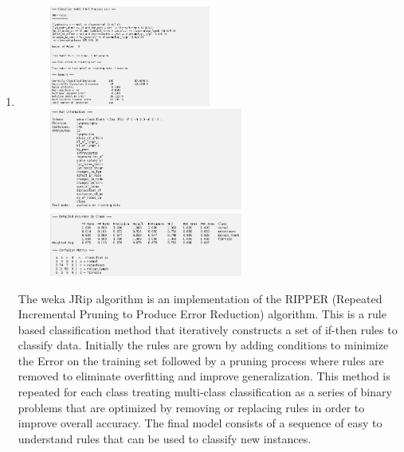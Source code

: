 \documentclass{article}
\begin{document}
\begin{enumerate}[label = (\alph*), left=10pt, itemsep=10pt]
        \item \begin{minipage}[t]{0.9\textwidth}
            \begin{figure}[H]
                \includegraphics[width=0.5\textwidth, height=0.2\textheight]{./6bi1.png}\\
                \includegraphics[width=0.6\textwidth, height=0.3\textheight]{./6bii1.png}\\
                \includegraphics[width=0.6\textwidth, height=0.15\textheight]{./6biii1.png}                
            \end{figure}
            The weka JRip algorithm is an implementation of the RIPPER (Repeated Incremental Pruning to Produce
            Error Reduction) algorithm. This is a rule based classification method that iteratively constructs a set
            of if-then rules to classify data. Initially the rules are grown by adding conditions to minimize the Error
            on the training set followed by a pruning process where rules are removed to eliminate overfitting and improve
            generalization. This method is repeated for each class treating multi-class classification as a series of
            binary problems that are optimized by removing or replacing rules in order to improve overall accuracy.
            The final model consists of a sequence of easy to understand rules that can be used to classify new instances.
        \end{minipage}

    \end{enumerate}
\end{document}
